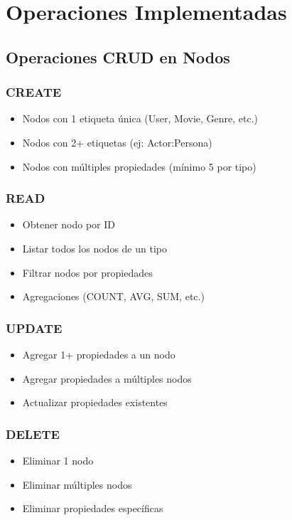 \documentclass[12pt]{article}
\begin{document}
\newpage
\section{Operaciones Implementadas}

\subsection{Operaciones CRUD en Nodos}

\subsubsection{CREATE}
\begin{itemize}
    \item Nodos con 1 etiqueta única (User, Movie, Genre, etc.)
    \item Nodos con 2+ etiquetas (ej: Actor:Persona)
    \item Nodos con múltiples propiedades (mínimo 5 por tipo)
\end{itemize}

\subsubsection{READ}
\begin{itemize}
    \item Obtener nodo por ID
    \item Listar todos los nodos de un tipo
    \item Filtrar nodos por propiedades
    \item Agregaciones (COUNT, AVG, SUM, etc.)
\end{itemize}

\subsubsection{UPDATE}
\begin{itemize}
    \item Agregar 1+ propiedades a un nodo
    \item Agregar propiedades a múltiples nodos
    \item Actualizar propiedades existentes
\end{itemize}

\subsubsection{DELETE}
\begin{itemize}
    \item Eliminar 1 nodo
    \item Eliminar múltiples nodos
    \item Eliminar propiedades específicas
\end{itemize}
\end{document}
